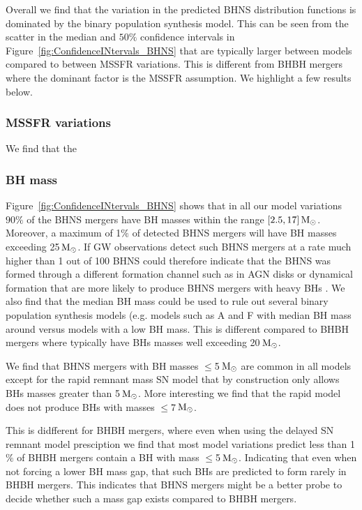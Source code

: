 \documentclass[twocolumn]{aastex63}
\newcommand\bhnsSingle{BHNS\xspace}
\newcommand{\Msun}{\ensuremath{\,\rm{M}_{\odot}}\xspace}
\begin{document}
Overall we find that the variation in the predicted \bhnsSingle distribution functions is dominated by the binary population synthesis model. This can  be seen from the scatter in the median and  $50\%$ confidence intervals in Figure~\ref{fig:ConfidenceINtervals_BHNS} that are typically larger between models compared to between \ac{MSSFR} variations. This is different from BHBH mergers where the dominant factor is the \ac{MSSFR} assumption. 
We highlight a few results below. 




\subsubsection{MSSFR variations}
We find that the 



\subsubsection{BH mass}
 Figure~\ref{fig:ConfidenceINtervals_BHNS} shows that in all our model variations  $90\%$ of the \bhnsSingle mergers have \ac{BH} masses within the range $[2.5, 17]\Msun$. Moreover,  a maximum of 1$\%$ of detected \bhnsSingle mergers will  have \ac{BH} masses exceeding 25\Msun. If \ac{GW} observations detect such \bhnsSingle mergers at a rate much higher than  1 out of 100 \bhnsSingle could therefore indicate that the \bhnsSingle was formed through a different formation channel such as in AGN disks or dynamical formation that are more likely to produce \bhnsSingle mergers with heavy \acp{BH}  \citep[][]{2020arXiv200302277R}.   We also find that the median \ac{BH} mass could be used to rule out several binary population synthesis models (e.g. models such as A and F with median \ac{BH} mass around  versus models with a  low \ac{BH} mass.
This is different compared to BHBH mergers where typically have \acp{BH} masses well exceeding 20\Msun. 

We find that \bhnsSingle mergers with \ac{BH} masses $\leq$5\Msun are common  in all models except for the rapid remnant mass SN model that by construction only allows \acp{BH} masses greater than 5\Msun. More interesting we find that the rapid model does not produce \acp{BH} with masses $\leq$7\Msun. 

This is didfferent for BHBH mergers, where even when using the delayed SN remnant model presciption we find that most model variations predict less than 1$\%$ of BHBH mergers contain a \ac{BH} with mass $\leq$5\Msun.  Indicating that even when not forcing a lower \ac{BH} mass gap, that such \acp{BH} are predicted to form rarely in BHBH mergers. This indicates that \bhnsSingle mergers might be a better probe to decide whether such a mass gap exists compared to BHBH mergers. 
\end{document}

